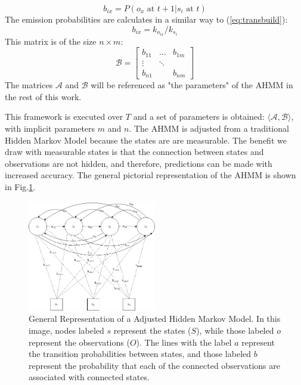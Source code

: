 \documentclass[conference]{IEEEtran}
\begin{document}
\begin{itemize}
        \begin{equation} \label{eq:obsref}
            b_{ix} = P(o_x \text{ at } t+1 \vert s_i \text{ at } t)
        \end{equation}
        The emission probabilities are calculates in a similar way to (\ref{eq:transbuild}):
        \begin{equation} \label{eq:obsbuild}
            b_{ix} = k_{o_{ix}}/k_{s_{i}}
        \end{equation}        
        This matrix is of the size $n\times m$:
        \begin{equation}
            \mathcal{B} = 
                    \begin{bmatrix}
                        b_{11} & \dots & b_{1m} \\
                        \vdots & \ddots & \\
                        b_{n1} &    & b_{nm}
                    \end{bmatrix}
        \end{equation}
        The matrices $\mathcal{A}$ and $\mathcal{B}$ will be referenced as "the parameters" of the AHMM in the rest of this work. 
\end{itemize}


This framework is executed over $T$ and a set of parameters is obtained: $\langle \mathcal{A}, \mathcal{B} \rangle$, with implicit parameters $m$ and $n$. The AHMM is adjusted from a traditional Hidden Markov Model because the states are are measurable. The benefit we draw with measurable states is that the connection between states and observations are not hidden, and therefore, predictions can be made with increased accuracy.
The general pictorial representation of the AHMM is shown in Fig.\ref{fig:hmm}.

\begin{figure}[ht]
    \includegraphics[width=0.5\textwidth]{ahmm.png}
    \caption{General Representation of a Adjusted Hidden Markov Model. In this image, nodes labeled $s$ represent the states ($S$), while those labeled $o$ represent the observations ($O$). The lines with the label $a$ represent the transition probabilities between states, and those labeled $b$ represent the probability that each of the connected observations are associated with connected states.}
    \label{fig:hmm}
\end{figure}
\end{document}
